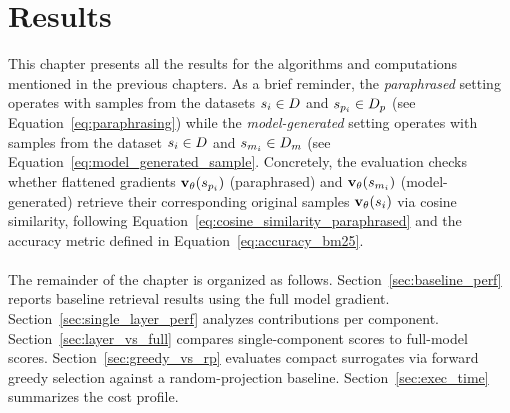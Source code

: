 \chapter{Results}
This chapter presents all the results for the algorithms and computations mentioned in the previous chapters. As a brief reminder, the \emph{paraphrased} setting operates with samples from the datasets $\si \in D$ and $\spi \in D_p$ (see Equation~\ref{eq:paraphrasing}) while the \emph{model-generated} setting operates with samples from the dataset $\si \in D$ and $\smi \in D_m$ (see Equation~\ref{eq:model_generated_sample}. Concretely, the evaluation checks whether flattened gradients $\vXspi[\theta]$ (paraphrased) and $\vXsmi[\theta]$ (model-generated) retrieve their corresponding original samples $\vXsi[\theta]$ via cosine similarity, following Equation~\ref{eq:cosine_similarity_paraphrased} and the accuracy metric defined in Equation~\ref{eq:accuracy_bm25}.
\\\\
The remainder of the chapter is organized as follows. Section~\ref{sec:baseline_perf} reports baseline retrieval results using the full model gradient. Section~\ref{sec:single_layer_perf} analyzes contributions per component. Section~\ref{sec:layer_vs_full} compares single-component scores to full-model scores. Section~\ref{sec:greedy_vs_rp} evaluates compact surrogates via forward greedy selection against a random-projection baseline. Section~\ref{sec:exec_time} summarizes the cost profile.

